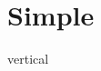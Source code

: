 \documentclass{article}
\begin{document}
\section{Simple}


\begin{stack}{vertical}
\sframe
  \cell[default]{}{}
  \cell[default]{}{}
\end{stack}\\ \newline
\end{document}
